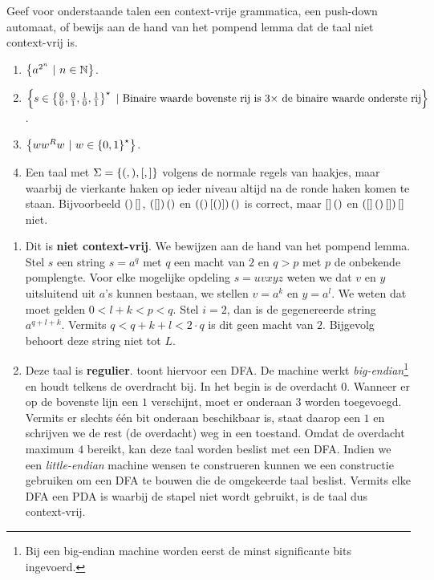 \documentclass{article}
\begin{document}
\begin{question}
Geef voor onderstaande talen een context-vrije grammatica, een push-down automaat, of bewijs aan de hand van het pompend lemma dat de taal niet context-vrij is.
\begin{enumerate}
 \item $\left\{ a^{2^n}\ |\ n\in\mathbb{N} \right\}$.
 \item $\left\{ s\in\left\{ \tfrac{0}{0},\tfrac{0}{1},\tfrac{1}{0},\tfrac{1}{1} \right\}^{\star}\ |\ \mbox{Binaire waarde bovenste rij is $3\times$ de binaire waarde onderste rij} \right\}$.
 \item $\left\{ ww^Rw\ |\ w\in\left\{ 0,1 \right\}^{\star} \right\}$.
 \item Een taal met $\Sigma=\left\{ (,),[,] \right\}$ volgens de normale regels van haakjes, maar waarbij de vierkante haken op ieder niveau altijd na de ronde haken komen te staan. Bijvoorbeeld $\left(  \right)\left[  \right]$, $\left( \left[  \right] \right){\left(  \right)}$ en $\left( \left(  \right)\left[ \left(  \right) \right] \right)\left(  \right)$ is correct, maar $\left[  \right]\left(  \right)$ en $\left( \left[  \right]\left(  \right)\left[  \right] \right)\left[  \right]$ niet.
\end{enumerate}
\begin{answer}
\begin{enumerate}
 \item Dit is \textbf{niet context-vrij}. We bewijzen aan de hand van het pompend lemma. Stel $s$ een string $s=a^q$ met $q$ een macht van $2$ en $q>p$ met $p$ de onbekende pomplengte. Voor elke mogelijke opdeling $s=uvxyz$ weten we dat $v$ en $y$ uitsluitend uit $a$'s kunnen bestaan, we stellen $v=a^k$ en $y=a^l$. We weten dat moet gelden $0<l+k<p<q$. Stel $i=2$, dan is de gegenereerde string $a^{q+l+k}$. Vermits $q<q+k+l<2\cdot q$ is dit geen macht van $2$. Bijgevolg behoort deze string niet tot $L$.
 \item Deze taal is \textbf{regulier}.  toont hiervoor een DFA. De machine werkt \emph{big-endian}\footnote{Bij een big-endian machine worden eerst de minst significante bits ingevoerd.} en houdt telkens de overdracht bij. In het begin is de overdacht $0$. Wanneer er op de bovenste lijn een $1$ verschijnt, moet er onderaan $3$ worden toegevoegd. Vermits er slechts \'e\'en bit onderaan beschikbaar is, staat daarop een $1$ en schrijven we de rest (de overdacht) weg in een toestand. Omdat de overdacht maximum $4$ bereikt, kan deze taal worden beslist met een DFA. Indien we een \emph{little-endian} machine wensen te construeren kunnen we een constructie gebruiken om een DFA te bouwen die de omgekeerde taal beslist. Vermits elke DFA een PDA is waarbij de stapel niet wordt gebruikt, is de taal dus context-vrij.\\

\end{enumerate}
\end{answer}
\end{question}
\end{document}
